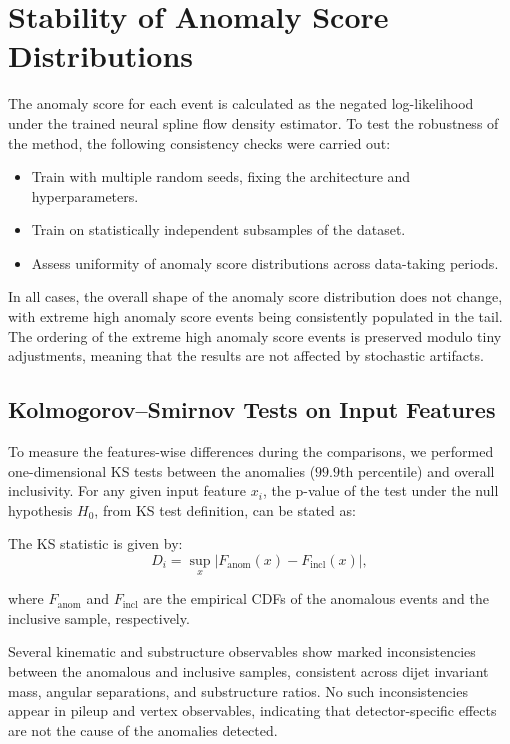\documentclass[11pt,a4paper,twocolumn]{article}
\begin{document}
\section{Stability of Anomaly Score Distributions}

The anomaly score for each event is calculated as the negated log-likelihood under the trained neural spline flow density estimator. To test the robustness of the method, the following consistency checks were carried out:

\begin{itemize}
  \item Train with multiple random seeds, fixing the architecture and hyperparameters.
  \item Train on statistically independent subsamples of the dataset.
  \item Assess uniformity of anomaly score distributions across data-taking periods.
\end{itemize}

In all cases, the overall shape of the anomaly score distribution does not change, with extreme high anomaly score events being consistently populated in the tail.
The ordering of the extreme high anomaly score events is preserved modulo tiny adjustments, meaning that the results are not affected by stochastic artifacts.

\subsection{Kolmogorov--Smirnov Tests on Input Features}

To measure the features-wise differences during the comparisons, we performed one-dimensional KS tests between the anomalies ($99.9$th percentile) and overall inclusivity.
For any given input feature $x_i$, the p-value of the test under the null hypothesis $H_0$, from KS test definition, can be stated as:

The KS statistic is given by:
\begin{equation}
D_i = \sup_x \left| F_{\mathrm{anom}}(x) - F_{\mathrm{incl}}(x) \right|,
\end{equation}

where $F_{\mathrm{anom}}$ and $F_{\mathrm{incl}}$ are the empirical CDFs of the anomalous events and the inclusive sample, respectively.

Several kinematic and substructure observables show marked inconsistencies between the anomalous and inclusive samples, consistent across dijet invariant mass, angular separations, and substructure ratios. No such inconsistencies appear in pileup and vertex observables, indicating that detector-specific effects are not the cause of the anomalies detected.
\end{document}
